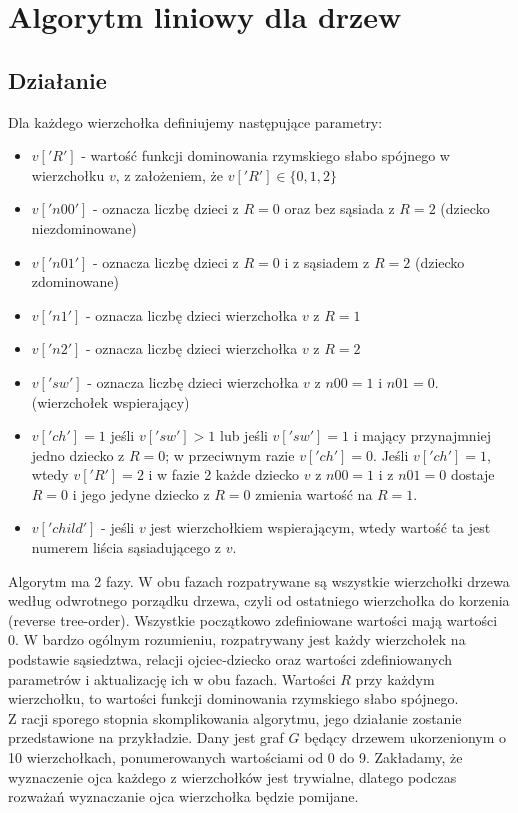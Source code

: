 \section{Algorytm liniowy dla drzew}

\subsection{Działanie}

Dla każdego wierzchołka definiujemy następujące parametry:
\begin{itemize}
    \item $v['R']$ - wartość funkcji dominowania rzymskiego słabo spójnego w wierzchołku $v$, z założeniem, że $v['R']\in\{0,1,2\}$
    \item $v['n00']$ - oznacza liczbę dzieci z $R=0$ oraz bez sąsiada z $R=2$ (dziecko niezdominowane)
    \item $v['n01']$ - oznacza liczbę dzieci z $R=0$ i z sąsiadem z $R=2$ (dziecko zdominowane)
    \item $v['n1']$ - oznacza liczbę dzieci wierzchołka $v$ z $R = 1$
    \item $v['n2']$ - oznacza liczbę dzieci wierzchołka $v$ z $R = 2$
    \item $v['sw']$ - oznacza liczbę dzieci wierzchołka $v$ z $n00=1$ i $n01=0$. (wierzchołek wspierający)
    \item $v['ch'] =1$ jeśli $v['sw']>1$ lub jeśli $v['sw']=1$ i mający przynajmniej jedno dziecko z $R=0$; w przeciwnym razie $v['ch'] =0$. Jeśli $v['ch'] =1$, wtedy $v['R']=2$ i w fazie 2 każde dziecko $v$ z $n00=1$ i z $n01=0$ dostaje $R=0$ i jego jedyne dziecko z $R=0$ zmienia wartość na $R=1$.
    \item $v['child']$ - jeśli $v$ jest wierzchołkiem wspierającym, wtedy wartość ta jest numerem liścia sąsiadującego z $v$.
\end{itemize}

Algorytm ma 2 fazy. W obu fazach rozpatrywane są wszystkie wierzchołki drzewa według odwrotnego porządku drzewa, czyli od ostatniego wierzchołka do korzenia (reverse tree-order). Wszystkie początkowo zdefiniowane wartości mają wartości 0. W bardzo ogólnym rozumieniu, rozpatrywany jest każdy wierzchołek na podstawie sąsiedztwa, relacji ojciec-dziecko oraz wartości zdefiniowanych parametrów i aktualizację ich w obu fazach. Wartości $R$ przy każdym wierzchołku, to wartości funkcji dominowania rzymskiego słabo spójnego.
\\
Z racji sporego stopnia skomplikowania algorytmu, jego działanie zostanie przedstawione na przykładzie.
Dany jest graf $G$ będący drzewem ukorzenionym o 10 wierzchołkach, ponumerowanych wartościami od 0 do 9. Zakładamy, że wyznaczenie ojca każdego z wierzchołków jest trywialne, dlatego podczas rozważań wyznaczanie ojca wierzchołka będzie pomijane.

